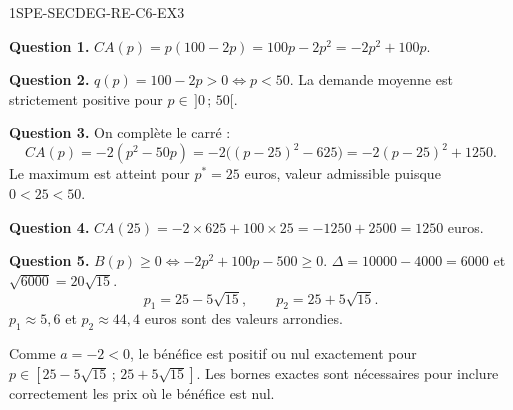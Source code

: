 \begin{corrige}{1SPE-SECDEG-RE-C6-EX3}

\textbf{Question 1.} $CA(p) = p(100 - 2p) = 100p - 2p^2 = -2p^2 + 100p$.

\textbf{Question 2.} $q(p) = 100 - 2p > 0 \Leftrightarrow p < 50$. La demande moyenne est strictement positive pour $p \in \,]0\,;\,50[$.

\textbf{Question 3.} On complète le carré :
\[
CA(p)=-2(p^2-50p)=-2\bigl((p-25)^2-625\bigr)=-2(p-25)^2+1250.
\]
Le maximum est atteint pour $p^*=25$ euros, valeur admissible puisque $0<25<50$.

\textbf{Question 4.} $CA(25) = -2 \times 625 + 100 \times 25 = -1250 + 2500 = 1250$ euros.

\textbf{Question 5.} $B(p) \geq 0 \Leftrightarrow -2p^2 + 100p - 500 \geq 0$.
$\Delta = 10000 - 4000 = 6000$ et $\sqrt{6000}=20\sqrt{15}$.
\[
p_1=25-5\sqrt{15},\qquad p_2=25+5\sqrt{15}.
\]
$p_1\approx5{,}6$ et $p_2\approx44{,}4$ euros sont des valeurs arrondies.

Comme $a=-2<0$, le bénéfice est positif ou nul exactement pour
$p\in[25-5\sqrt{15}\,;\,25+5\sqrt{15}]$.
Les bornes exactes sont nécessaires pour inclure correctement les prix où le bénéfice est nul.

\end{corrige}
